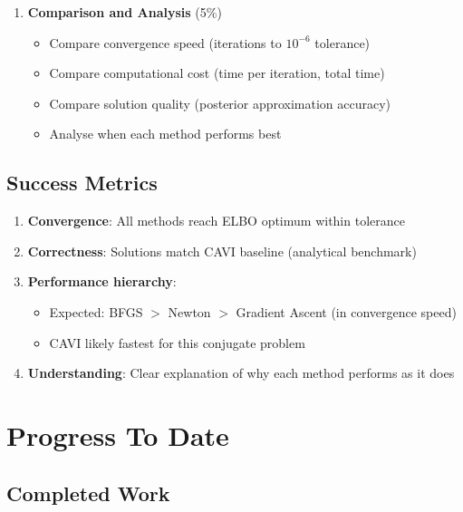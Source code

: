 \documentclass[11pt]{article}
\begin{document}
\begin{enumerate}[leftmargin=*]
\item \textbf{Comparison and Analysis} (5\%)
\begin{itemize}
\item Compare convergence speed (iterations to $10^{-6}$ tolerance)
\item Compare computational cost (time per iteration, total time)
\item Compare solution quality (posterior approximation accuracy)
\item Analyse when each method performs best
\end{itemize}
\end{enumerate}

\subsection{Success Metrics}

\begin{enumerate}
\item \textbf{Convergence}: All methods reach ELBO optimum within tolerance
\item \textbf{Correctness}: Solutions match CAVI baseline (analytical benchmark)
\item \textbf{Performance hierarchy}: 
\begin{itemize}
\item Expected: BFGS $>$ Newton $>$ Gradient Ascent (in convergence speed)
\item CAVI likely fastest for this conjugate problem
\end{itemize}
\item \textbf{Understanding}: Clear explanation of why each method performs as it does
\end{enumerate}

\section{Progress To Date}

\subsection{Completed Work}
\end{document}
